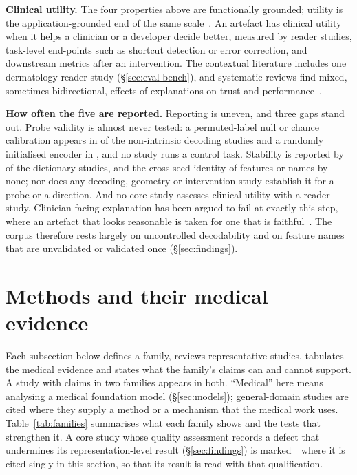 \textbf{Clinical utility.} The four properties above are functionally grounded; utility is the
application-grounded end of the same scale~\cite{doshivelez2017towards}. An artefact has clinical utility
when it helps a clinician or a developer decide better, measured by reader studies, task-level end-points
such as shortcut detection or error correction, and downstream metrics after an intervention. The
contextual literature includes one dermatology reader study (\S\ref{sec:eval-bench}), and systematic
reviews find mixed, sometimes bidirectional, effects of explanations on trust and
performance~\cite{rosenbacke2024how}.

\textbf{How often the five are reported.} Reporting is uneven, and three gaps stand out. Probe validity is almost never tested: a permuted-label null or chance
calibration appears in \Nprobectrl{} of the \Ndecni{} non-intrinsic decoding studies and a randomly
initialised encoder in \Nproberand{}, and no study runs a control task. Stability is reported by
\Nsaestab{} of the \Nsae{} dictionary studies, and the cross-seed identity of features or names by none;
nor does any decoding, geometry or intervention study establish it for a probe or a direction. And no
core study assesses clinical utility with a reader study. Clinician-facing explanation has been argued to
fail at exactly this step, where an artefact that looks reasonable is taken for one that is
faithful~\cite{ghassemi2021falsehope}. The corpus therefore rests largely on uncontrolled decodability
and on feature names that are unvalidated or validated once (\S\ref{sec:findings}).

\section{Methods and their medical evidence}
\label{sec:methods}

Each subsection below defines a family, reviews representative studies, tabulates the medical evidence
and states what the family's claims can and cannot support. A study with claims in two families appears
in both. ``Medical'' here means analysing a medical foundation model (\S\ref{sec:models}); general-domain
studies are cited where they supply a method or a mechanism that the medical work uses.
Table~\ref{tab:families} summarises what each family shows and the tests that strengthen it. A core
study whose quality assessment records a defect that undermines its representation-level result
(\S\ref{sec:findings}) is marked $^{\dagger}$ where it is cited singly in this section, so that its
result is read with that qualification.








